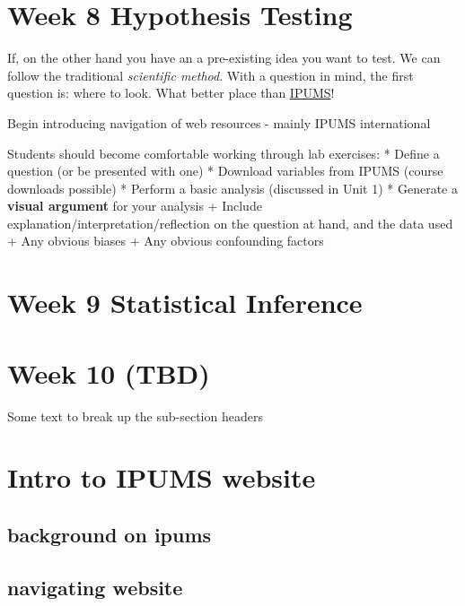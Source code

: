 \documentclass[
]{book}
\begin{document}
\hypertarget{hypothesis}{%
\section{Week 8 Hypothesis Testing}\label{hypothesis}}

If, on the other hand you have an a pre-existing idea you want to test. We can follow the traditional \emph{scientific method}. With a question in mind, the first question is: where to look. What better place than \href{https://ipums.org}{IPUMS}!

Begin introducing navigation of web resources - mainly IPUMS international

Students should become comfortable working through lab exercises:
* Define a question (or be presented with one)
* Download variables from IPUMS (course downloads possible)
* Perform a basic analysis (discussed in Unit 1)
* Generate a \textbf{visual argument} for your analysis
+ Include explanation/interpretation/reflection on the question at hand, and the data used
+ Any obvious biases
+ Any obvious confounding factors

\hypertarget{week-9-statistical-inference-1}{%
\section{Week 9 Statistical Inference}\label{week-9-statistical-inference-1}}

\hypertarget{week-10-tbd-1}{%
\section{Week 10 (TBD)}\label{week-10-tbd-1}}

Some text to break up the sub-section headers

\hypertarget{intro-to-ipums-website}{%
\section{Intro to IPUMS website}\label{intro-to-ipums-website}}

\hypertarget{background-on-ipums}{%
\subsection{background on ipums}\label{background-on-ipums}}

\hypertarget{navigating-website}{%
\subsection{navigating website}\label{navigating-website}}
\end{document}
